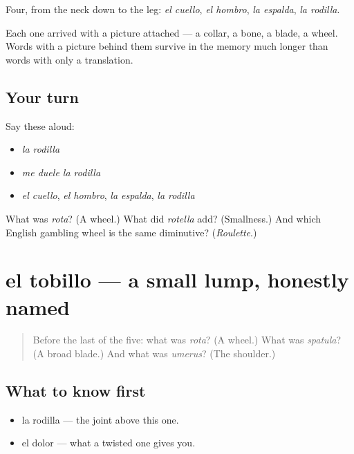 \begin{grammarlens}[title={What you've built}]
Four, from the neck down to the leg: \emph{el cuello}, \emph{el hombro}, \emph{la espalda}, \emph{la rodilla}.

Each one arrived with a picture attached — a collar, a bone, a blade, a wheel. Words with a picture behind them survive in the memory much longer than words with only a translation.
\end{grammarlens}

\subsection*{Your turn}
Say these aloud:

\begin{itemize}
\raggedright
  \item \emph{la rodilla}
  \item \emph{me duele la rodilla}
  \item \emph{el cuello}, \emph{el hombro}, \emph{la espalda}, \emph{la rodilla}
\end{itemize}

\begin{tcolorbox}[breakable,colback=teal!4,colframe=teal!35!black,title={Before you move on}]
What was \emph{rota}? (A wheel.) What did \emph{rotella} add? (Smallness.) And which English gambling wheel is the same diminutive? (\emph{Roulette}.)
\end{tcolorbox}
\section[el tobillo]{el tobillo — a small lump, honestly named}

\label{lesson:ES-C293-tobillo}



\begin{quote}
Before the last of the five: what was \emph{rota}? (A wheel.) What was \emph{spatula}? (A broad blade.) And what was \emph{umerus}? (The shoulder.)
\end{quote}

\subsection*{What to know first}
\begin{itemize}
\raggedright
  \item la rodilla — the joint above this one.
  \item el dolor — what a twisted one gives you.
\end{itemize}

